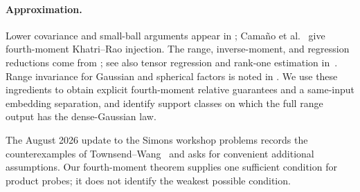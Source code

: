 \documentclass[11pt,a4paper]{article}
\theoremstyle{definition}\newtheorem{definition}[theorem]{Definition}
\theoremstyle{remark}\newtheorem{remark}[theorem]{Remark}
\numberwithin{equation}{section}
\begin{document}
\paragraph{Approximation.}
Lower covariance and small-ball arguments appear in
\cite{Oliveira2016,KM2015}; Cama\~no et al.~\cite[Theorem~5.1]{CEMT2025}
give fourth-moment Khatri--Rao injection.
The range, inverse-moment, and regression reductions come from
\cite{Sarlos2006,CW2009,HMT2011,DMMW2011,CNW2016,TYUCPSD2017}; see also tensor regression
and rank-one estimation in~\cite{ChenJin2021,BK2021}.
Range invariance for Gaussian and spherical factors is noted in
\cite[Section~5.4]{CEMT2025}. We use these ingredients to obtain
explicit fourth-moment relative guarantees and a same-input embedding
separation, and identify support classes on which the full range output
has the dense-Gaussian law.

The August 2026 update to the Simons workshop problems
\cite[Problems~5.1--5.2]{Simons2026} records the counterexamples of
Townsend--Wang~\cite{TW2026} and asks for convenient additional assumptions.
Our fourth-moment theorem supplies one sufficient condition for product
probes; it does not identify the weakest possible condition.
\end{document}
